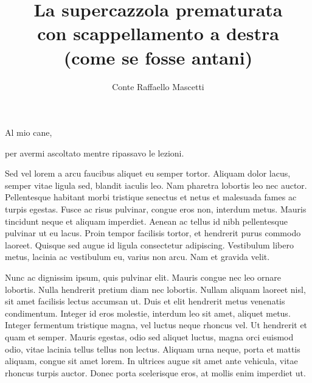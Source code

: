 \documentclass[target=bach,aauheader=,style=]{thud}
\title{La supercazzola prematurata \\ con scappellamento a destra \\ (come se fosse antani)}
\author{Conte Raffaello Mascetti}
\begin{document}
\maketitle

\begin{dedication}
	Al mio cane,\par per avermi ascoltato mentre ripassavo le lezioni.
\end{dedication}

\acknowledgements
Sed vel lorem a arcu faucibus aliquet eu semper tortor. Aliquam dolor lacus, semper vitae ligula sed, blandit iaculis leo. Nam pharetra lobortis leo nec auctor. Pellentesque habitant morbi tristique senectus et netus et malesuada fames ac turpis egestas. Fusce ac risus pulvinar, congue eros non, interdum metus. Mauris tincidunt neque et aliquam imperdiet. Aenean ac tellus id nibh pellentesque pulvinar ut eu lacus. Proin tempor facilisis tortor, et hendrerit purus commodo laoreet. Quisque sed augue id ligula consectetur adipiscing. Vestibulum libero metus, lacinia ac vestibulum eu, varius non arcu. Nam et gravida velit.

\abstract
Nunc ac dignissim ipsum, quis pulvinar elit. Mauris congue nec leo ornare lobortis. Nulla hendrerit pretium diam nec lobortis. Nullam aliquam laoreet nisl, sit amet facilisis lectus accumsan ut. Duis et elit hendrerit metus venenatis condimentum. Integer id eros molestie, interdum leo sit amet, aliquet metus. Integer fermentum tristique magna, vel luctus neque rhoncus vel. Ut hendrerit et quam et semper. Mauris egestas, odio sed aliquet luctus, magna orci euismod odio, vitae lacinia tellus tellus non lectus. Aliquam urna neque, porta et mattis aliquam, congue sit amet lorem. In ultrices augue sit amet ante vehicula, vitae rhoncus turpis auctor. Donec porta scelerisque eros, at mollis enim imperdiet ut. 

\tableofcontents



\mainmatter

\end{document}
